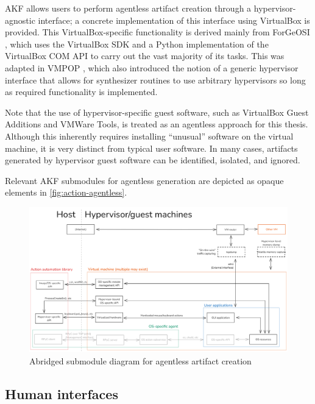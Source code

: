 \documentclass[letterpaper,12pt]{report}
\begin{document}
AKF allows users to perform agentless artifact creation through a
hypervisor-agnostic interface; a concrete implementation of this
interface using VirtualBox is provided. This VirtualBox-specific
functionality is derived mainly from ForGeOSI
\cite{maxfraggMaxfraggForGeOSI2023}, which uses the VirtualBox SDK
and a Python implementation of the VirtualBox COM API
\cite{larsonSethmlarsonVirtualboxpython2025} to carry out the vast
majority of its tasks. This was adapted in VMPOP
\cite{parkTREDEVMPOPCultivating2018}, which also introduced the
notion of a generic hypervisor interface that allows for synthesizer
routines to use arbitrary hypervisors so long as required functionality
is implemented.

Note that the use of hypervisor-specific guest software, such as
VirtualBox Guest Additions and VMWare Tools, is treated as an agentless
approach for this thesis. Although this inherently requires installing
``unusual'' software on the virtual machine, it is very distinct from
typical user software. In many cases, artifacts generated by hypervisor
guest software can be identified, isolated, and ignored.

Relevant AKF submodules for agentless generation are depicted as opaque
elements in \autoref{fig:action-agentless}.

\begin{figure}[htbp]
\centering
\includegraphics[width=1\linewidth]{action-agentless.png}
\caption{Abridged submodule diagram for agentless artifact
creation}\label{fig:action-agentless}
\end{figure}

\subsection{Human interfaces}\label{human-interfaces}
\end{document}

